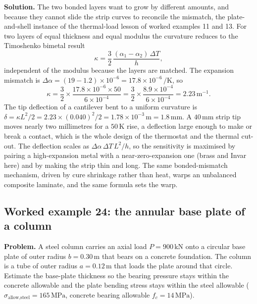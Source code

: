 \textbf{Solution.} The two bonded layers want to grow by different amounts,
and because they cannot slide the strip curves to reconcile the mismatch,
the plate-and-shell instance of the thermal-load lesson of worked examples
11 and 13. For two layers of equal thickness and equal modulus the
curvature reduces to the Timoshenko bimetal result
\[
\kappa = \frac{3}{2}\,\frac{(\alpha_1 - \alpha_2)\,\Delta T}{h},
\]
independent of the modulus because the layers are matched. The expansion
mismatch is $\Delta\alpha = (19 - 1.2)\times 10^{-6} = 17.8\times 10^{-6}\,
\si{\per\kelvin}$, so
\[
\kappa = \frac{3}{2}\times \frac{17.8\times 10^{-6}\times 50}{6\times 10^{-4}}
= \frac{3}{2}\times \frac{8.9\times 10^{-4}}{6\times 10^{-4}}
= 2.23\,\text{m}^{-1}.
\]
The tip deflection of a cantilever bent to a uniform curvature is $\delta =
\kappa L^2/2 = 2.23\times (0.040)^2/2 = 1.78\times 10^{-3}\,\text{m} =
1.8\,\si{\milli\meter}$. A $40\,\si{\milli\meter}$ strip tip moves nearly
two millimetres for a $50\,\si{\kelvin}$ rise, a deflection large enough to
make or break a contact, which is the whole design of the thermostat and
the thermal cut-out. The deflection scales as $\Delta\alpha\,\Delta T\,
L^2/h$, so the sensitivity is maximised by pairing a high-expansion metal
with a near-zero-expansion one (brass and Invar here) and by making the
strip thin and long. The same bonded-mismatch mechanism, driven by cure
shrinkage rather than heat, warps an unbalanced composite laminate, and the
same formula sets the warp.

\subsection*{Worked example 24: the annular base plate of a column}

\textbf{Problem.} A steel column carries an axial load $P = 900\,\text{kN}$
onto a circular base plate of outer radius $b = 0.30\,\si{\meter}$ that
bears on a concrete foundation. The column is a tube of outer radius
$a = 0.12\,\si{\meter}$ that loads the plate around that circle. Estimate
the base-plate thickness so the bearing pressure stays within the concrete
allowable and the plate bending stress stays within the steel allowable
($\sigma_{\text{allow,steel}} = 165\,\text{MPa}$, concrete bearing allowable
$f_c = 14\,\text{MPa}$).

